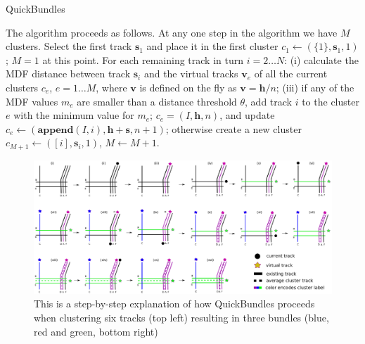 \documentclass{bioinfo}
\begin{document}
\begin{methods}
\begin{algorithm}
\caption{QuickBundles}
\label{Alg:QuickBundles}
\end{algorithm}

The algorithm proceeds as follows.  At any one step in the algorithm we
have $M$ clusters. Select the first track $\mathbf{s}_{1}$ and place it in
the first cluster $c_{1}\leftarrow(\{1\},\mathbf{s}_{1},1)$;  
$M=1$ at this point.  For each remaining track in turn $i = 2 \dots N$:
(i) calculate the MDF distance between track $\mathbf{s}_{i}$ and the virtual
tracks $\mathbf{v}_{e}$ of all the current clusters $c_{e}$, $e = 1 \dots M$,
where $\mathbf{v}$ is defined on the fly as $\mathbf{v}=\mathbf{h}/n$; (iii) if
any of the MDF values $m_{e}$ are smaller than a distance threshold
$\theta$, add track $i$ to the cluster $e$ with the minimum value for
$m_{e}$; $c_{e}=(I,\mathbf{h},n)$, and update
$c_{e}\leftarrow(\mathbf{append}(I,i),\mathbf{h}+\mathbf{s},n+1)$; otherwise create a new
cluster $c_{M+1}\leftarrow([i],\mathbf{s}_{i},1)$, $M\leftarrow M+1$.


\begin{figure}[t]
\centering\includegraphics[width=160mm,angle=0]{Figures/Fig_1_QB_algorithm}
\caption{This is a step-by-step explanation of how QuickBundles proceeds when clustering six tracks (top left) resulting in three bundles (blue, red and green, bottom right)}
\label{Fig:LSC_simple}
\end{figure}


\end{methods}
\end{document}
